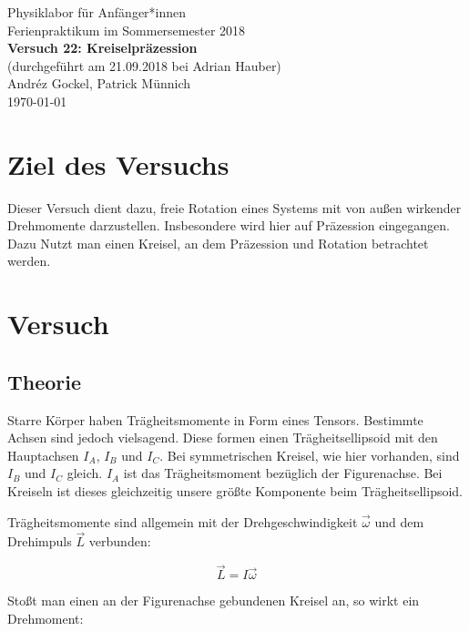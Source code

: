 \documentclass[11pt,a4paper]{article}
\begin{document}
{
\centering 
\large 
Physiklabor für Anf\"anger*innen \\
Ferienpraktikum im Sommersemester 2018 \\[4mm]
\textbf{\LARGE 
Versuch 22: Kreiselpr\"azession
} \\[3mm]
(durchgef\"uhrt am 21.09.2018 bei Adrian Hauber) \\
Andréz Gockel, Patrick M\"unnich\\
\today \\[10mm]
}

\vspace{50pt}
\tableofcontents
\vspace{22pt}
\listoftables
\vspace{22pt}
\listoffigures
\pagebreak

\section{Ziel des Versuchs}

Dieser Versuch dient dazu, freie Rotation eines Systems mit von au\ss en wirkender Drehmomente darzustellen. Insbesondere wird hier auf Pr\"azession eingegangen. Dazu Nutzt man einen Kreisel, an dem Pr\"azession und Rotation betrachtet werden.

\section{Versuch}

\subsection{Theorie}

Starre K\"orper haben Tr\"agheitsmomente in Form eines Tensors. Bestimmte Achsen sind jedoch vielsagend. Diese formen einen Tr\"agheitsellipsoid mit den Hauptachsen $I_A$, $I_B$ und $I_C$. Bei symmetrischen Kreisel, wie hier vorhanden, sind $I_B$ und $I_C$ gleich. $I_A$ ist das Tr\"agheitsmoment bez\"uglich der Figurenachse. Bei Kreiseln ist dieses gleichzeitig unsere gr\"o\ss te Komponente beim Tr\"agheitsellipsoid.

Tr\"agheitsmomente sind allgemein mit der Drehgeschwindigkeit $\vec{\omega}$ und dem Drehimpuls $\vec{L}$ verbunden:

\begin{equation}
\vec{L}=I\vec{\omega}
\end{equation}

Sto\ss t man einen an der Figurenachse gebundenen Kreisel an, so wirkt ein Drehmoment:
\end{document}
